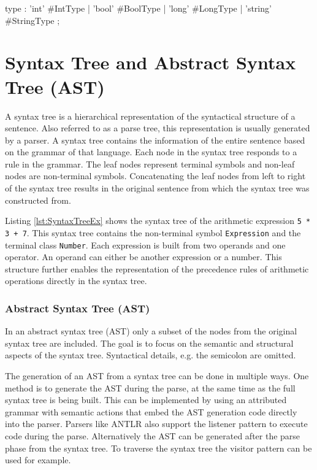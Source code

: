 \begin{AntlrCode}[float,numbers=none,caption=Example rule using alternative labels for the rule alternatives., label=lst:ANTLRRuleAlt]
  type
      : 'int'     #IntType
      | 'bool'    #BoolType
      | 'long'    #LongType
      | 'string'  #StringType
      ;
  \end{AntlrCode}

\section{Syntax Tree and Abstract Syntax Tree (AST)}

A syntax tree is a hierarchical representation of the syntactical structure of a sentence. Also referred to as a parse tree, this representation is usually generated by a parser. A syntax tree contains the information of the entire sentence based on the grammar of that language. Each node in the syntax tree responds to a rule in the grammar. The leaf nodes represent terminal symbols and non-leaf nodes are non-terminal symbols. Concatenating the leaf nodes from left to right of the syntax tree results in the original sentence from which the syntax tree was constructed from. 

Listing \ref{lst:SyntaxTreeEx} shows the syntax tree of the arithmetic expression \texttt{5 * 3 + 7}. This syntax tree contains the non-terminal symbol \texttt{Expression} and the terminal class \texttt{Number}. Each expression is built from two operands and one operator. An operand can either be another expression or a number. This structure further enables the representation of the precedence rules of arithmetic operations directly in the syntax tree.  

\subsubsection{Abstract Syntax Tree (AST)}
In an abstract syntax tree (AST) only a subset of the nodes from the original syntax tree are included. The goal is to focus on the semantic and structural aspects of the syntax tree. Syntactical details, e.g. the semicolon are omitted. 

The generation of an AST from a syntax tree can be done in multiple ways. One method is to generate the AST during the parse, at the same time as the full syntax tree is being built. This can be implemented by using an attributed grammar with semantic actions that embed the AST generation code directly into the parser. Parsers like ANTLR also support the listener pattern to execute code during the parse. Alternatively the AST can be generated after the parse phase from the syntax tree. To traverse the syntax tree the visitor pattern can be used for example.  

